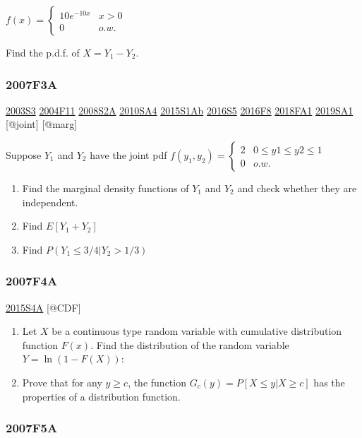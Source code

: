 \documentclass[6pt,Portrait]{article}
\begin{document}
\(f(x)=\begin{cases}10e^{-10x}& x>0\\0& o.w.\end{cases}\)

Find the p.d.f. of \(X=Y_1-Y_2\).

\hypertarget{f3a}{%
\subsubsection{2007F3A}\label{f3a}}

\protect\hyperlink{s3}{2003S3} \protect\hyperlink{f11}{2004F11}
\protect\hyperlink{s2a}{2008S2A} \protect\hyperlink{sa4-1}{2010SA4}
\protect\hyperlink{s1ab}{2015S1Ab} \protect\hyperlink{s5-4}{2016S5}
\protect\hyperlink{f8-4}{2016F8} \protect\hyperlink{fa1-4}{2018FA1}
\protect\hyperlink{sa1-3}{2019SA1} {[}@joint{]} {[}@marg{]}

Suppose \(Y_1\) and \(Y_2\) have the joint pdf
\(f(y_1,y_2)=\begin{cases}2&0\le y1\le y2\le 1\\0& o.w.\end{cases}\)

\begin{enumerate}
\def\labelenumi{(\alph{enumi})}
\item
  Find the marginal density functions of \(Y_1\) and \(Y_2\) and check
  whether they are independent.
\item
  Find \(E[Y_1+Y_2]\)
\item
  Find \(P(Y_1\le3/4|Y_2>1/3)\)
\end{enumerate}

\hypertarget{f4a}{%
\subsubsection{2007F4A}\label{f4a}}

\protect\hyperlink{s4a-1}{2015S4A} {[}@CDF{]}

\begin{enumerate}
\def\labelenumi{(\alph{enumi})}
\item
  Let \(X\) be a continuous type random variable with cumulative
  distribution function \(F(x)\). Find the distribution of the random
  variable \(Y=\ln(1-F(X))\):
\item
  Prove that for any \(y\ge c\), the function
  \(G_c(y)=P[X\le y|X\ge c]\) has the properties of a distribution
  function.
\end{enumerate}

\hypertarget{f5a}{%
\subsubsection{2007F5A}\label{f5a}}
\end{document}
